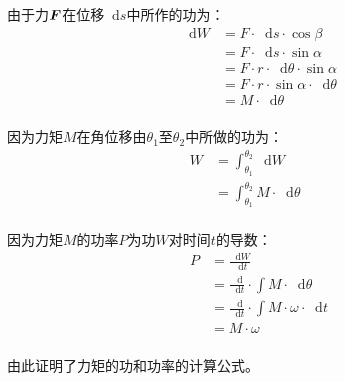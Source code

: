 \documentclass[UTF8]{ctexart}
\newcommand*{\veb}[1]{\vb*{#1}}
\newcommand*{\dif}{\mathop{}\!\mathrm{d}}
\begin{document}
\newpage

    由于力$\veb{F}$在位移$\dif s$中所作的功为：
    \setcounter{equation}{0}
    \begin{align}
        \dif W
        &=F\cdot\dif s\cdot\cos{\beta}\\[3mm]
        &=F\cdot\dif s\cdot\sin{\alpha}\\[3mm]
        &=F\cdot r\cdot\dif\theta\cdot\sin{\alpha}\\[3mm]
        &=F\cdot r\cdot\sin{\alpha}\cdot\dif\theta\\[3mm]
        &=M\cdot\dif\theta
    \end{align}\\
    因为力矩$M$在角位移由$\theta_1$至$\theta_2$中所做的功为：\vspace{3pt}
    \begin{align}
        W
        &=\int_{\theta_1}^{\theta_2}\dif W\\[3mm]
        &=\int_{\theta_1}^{\theta_2}M\cdot\dif\theta~~~~~~~~~
    \end{align}\\
    因为力矩$M$的功率$P$为功$W$对时间$t$的导数：\vspace{5pt}
    \begin{align}
        P
        &=\frac{\dif W}{\dif t}\\[3mm]
        &=\frac{\dif}{\dif t}\cdot\int M\cdot\dif\theta\\[3mm]
        &=\frac{\dif}{\dif t}\cdot\int M\cdot\omega\cdot\dif t\\[3mm]
        &=M\cdot\omega
    \end{align}\\
    由此证明了力矩的功和功率的计算公式。

\newpage
\end{document}
